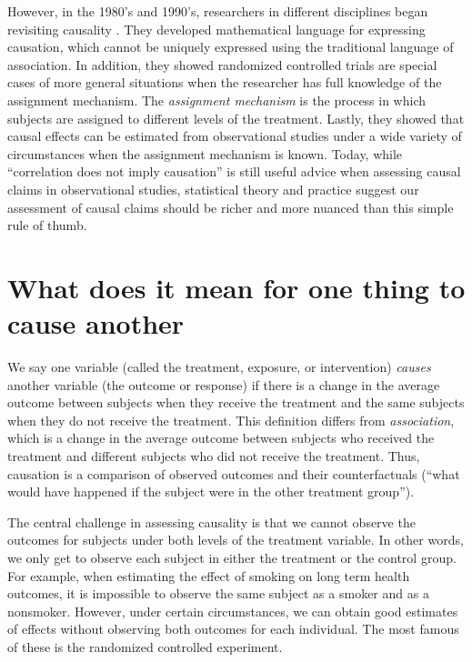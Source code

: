\documentclass[]{book}
\begin{document}
However, in the 1980's and 1990's, researchers in different disciplines began revisiting causality \citep{greenland1986identifiability, pearl1993bayesian, angrist1995identification}. They developed mathematical language for expressing causation, which cannot be uniquely expressed using the traditional language of association. In addition, they showed randomized controlled trials are special cases of more general situations when the researcher has full knowledge of the assignment mechanism. The \emph{assignment mechanism} is the process in which subjects are assigned to different levels of the treatment. Lastly, they showed that causal effects can be estimated from observational studies under a wide variety of circumstances when the assignment mechanism is known. Today, while ``correlation does not imply causation'' is still useful advice when assessing causal claims in observational studies, statistical theory and practice suggest our assessment of causal claims should be richer and more nuanced than this simple rule of thumb.

\hypertarget{what-does-it-mean-for-one-thing-to-cause-another}{%
\section{What does it mean for one thing to cause another}\label{what-does-it-mean-for-one-thing-to-cause-another}}

We say one variable (called the treatment, exposure, or intervention) \emph{causes} another variable (the outcome or response) if there is a change in the average outcome between subjects when they receive the treatment and the same subjects when they do not receive the treatment. This definition differs from \emph{association}, which is a change in the average outcome between subjects who received the treatment and different subjects who did not receive the treatment. Thus, causation is a comparison of observed outcomes and their counterfactuals (``what would have happened if the subject were in the other treatment group'').

The central challenge in assessing causality is that we cannot observe the outcomes for subjects under both levels of the treatment variable. In other words, we only get to observe each subject in either the treatment or the control group. For example, when estimating the effect of smoking on long term health outcomes, it is impossible to observe the same subject as a smoker and as a nonsmoker. However, under certain circumstances, we can obtain good estimates of effects without observing both outcomes for each individual. The most famous of these is the randomized controlled experiment.
\end{document}
